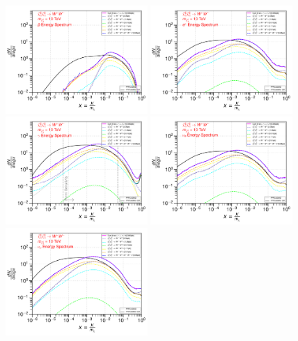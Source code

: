 \documentclass[epj,nopacs,fleqn]{svjour}
\begin{document}
\begin{figure}[!h]
	\centering
	\subfigure
	{ \includegraphics[width=0.48\textwidth]{Fig/n1ww_comparison/10000.0_antiprotons_n1ww_comparison_10000.0.pdf} } 
	\subfigure
	{\includegraphics[width=0.48\textwidth]{Fig/n1ww_comparison/10000.0_positrons_n1ww_comparison_10000.0.pdf} }
	\subfigure
	{\includegraphics[width=0.48\textwidth]{Fig/n1ww_comparison/10000.0_gammas_n1ww_comparison_10000.0.pdf} }
	\subfigure
	{\includegraphics[width=0.48\textwidth]{Fig/n1ww_comparison/10000.0_neutrinos_e_n1ww_comparison_10000.0.pdf} }
	\subfigure
	{\includegraphics[width=0.48\textwidth]{Fig/n1ww_comparison/10000.0_neutrinos_mu_n1ww_comparison_10000.0.pdf} }

\end{figure}
\end{document}
